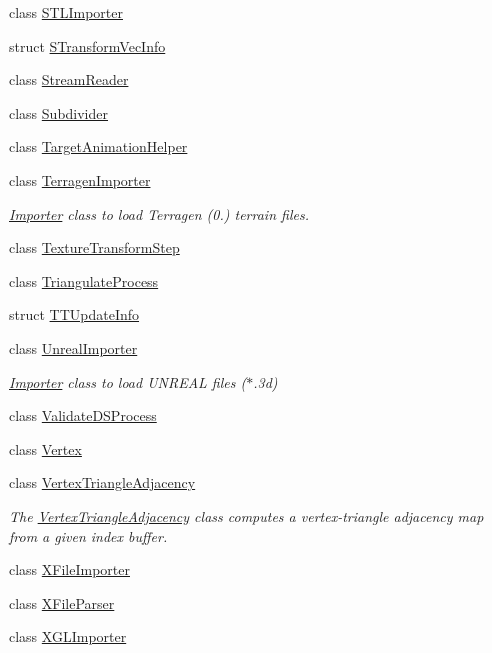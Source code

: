 \begin{DoxyCompactItemize}
\item 
class \hyperlink{class_assimp_1_1_s_t_l_importer}{S\+T\+L\+Importer}
\item 
struct \hyperlink{struct_assimp_1_1_s_transform_vec_info}{S\+Transform\+Vec\+Info}
\item 
class \hyperlink{singleton_assimp_1_1_stream_reader}{Stream\+Reader}
\item 
class \hyperlink{class_assimp_1_1_subdivider}{Subdivider}
\item 
class \hyperlink{class_assimp_1_1_target_animation_helper}{Target\+Animation\+Helper}
\item 
class \hyperlink{class_assimp_1_1_terragen_importer}{Terragen\+Importer}
\begin{DoxyCompactList}\small\item\em \hyperlink{class_assimp_1_1_importer}{Importer} class to load Terragen (0.) terrain files. \end{DoxyCompactList}\item 
class \hyperlink{class_assimp_1_1_texture_transform_step}{Texture\+Transform\+Step}
\item 
class \hyperlink{class_assimp_1_1_triangulate_process}{Triangulate\+Process}
\item 
struct \hyperlink{struct_assimp_1_1_t_t_update_info}{T\+T\+Update\+Info}
\item 
class \hyperlink{class_assimp_1_1_unreal_importer}{Unreal\+Importer}
\begin{DoxyCompactList}\small\item\em \hyperlink{class_assimp_1_1_importer}{Importer} class to load U\+N\+R\+E\+A\+L files ($\ast$.3d) \end{DoxyCompactList}\item 
class \hyperlink{class_assimp_1_1_validate_d_s_process}{Validate\+D\+S\+Process}
\item 
class \hyperlink{class_assimp_1_1_vertex}{Vertex}
\item 
class \hyperlink{class_assimp_1_1_vertex_triangle_adjacency}{Vertex\+Triangle\+Adjacency}
\begin{DoxyCompactList}\small\item\em The \hyperlink{class_assimp_1_1_vertex_triangle_adjacency}{Vertex\+Triangle\+Adjacency} class computes a vertex-\/triangle adjacency map from a given index buffer. \end{DoxyCompactList}\item 
class \hyperlink{class_assimp_1_1_x_file_importer}{X\+File\+Importer}
\item 
class \hyperlink{class_assimp_1_1_x_file_parser}{X\+File\+Parser}
\item 
class \hyperlink{class_assimp_1_1_x_g_l_importer}{X\+G\+L\+Importer}
\end{DoxyCompactItemize}
